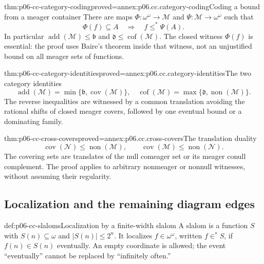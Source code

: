 \begin{hbtheorem}{thm:p06-cc-category-coding}{proved=annex:p06.cc.category-coding}{Coding a bound from a meager container}
There are maps \(\Phi:\omega^\omega\longrightarrow
\mathcal M\) and
\(\Psi:\mathcal M\longrightarrow\omega^\omega\) such that
\[
 \Phi(f)\subseteq A\quad\Longrightarrow\quad f\leq^*\Psi(A).
\]
In particular
\(\operatorname{add}(\mathcal M)\leq\mathfrak b\)
and \(\mathfrak d\leq\operatorname{cof}(\mathcal M)\).
The closed witness \(\Phi(f)\) is essential: the proof uses Baire's theorem
inside that witness, not an unjustified bound on all meager sets of functions.
\end{hbtheorem}

\begin{hbtheorem}{thm:p06-cc-category-identities}{proved=annex:p06.cc.category-identities}{The two category identities}
\[
\operatorname{add}(\mathcal M)
 =\min\{\mathfrak b,\operatorname{cov}(\mathcal M)\},
\quad
\operatorname{cof}(\mathcal M)
 =\max\{\mathfrak d,\operatorname{non}(\mathcal M)\}.
\]
The reverse inequalities are witnessed by a common translation avoiding
the rational shifts of closed meager covers, followed by one eventual
bound or a dominating family.
\end{hbtheorem}

\begin{hbtheorem}{thm:p06-cc-cross-covers}{proved=annex:p06.cc.cross-covers}{The translation duality}
\[
\operatorname{cov}(\mathcal N)
 \leq\operatorname{non}(\mathcal M),\qquad
\operatorname{cov}(\mathcal M)
 \leq\operatorname{non}(\mathcal N).
\]
The covering sets are translates of the null comeager set or its meager
conull complement. The proof applies to arbitrary nonmeager or nonnull
witnesses, without assuming their regularity.
\end{hbtheorem}

\subsection{Localization and the remaining diagram edges}

\begin{hbdefinition}{def:p06-cc-slaloms}{Localization by a finite-width slalom}
A slalom is a function \(S\) with \(S(n)\subseteq\omega\) and
\(|S(n)|\leq 2^n\). It localizes \(f\in\omega^\omega\), written
\(f\in^*S\), if \(f(n)\in S(n)\) eventually. An empty coordinate is
allowed; the event ``eventually'' cannot be replaced by ``infinitely often.''
\end{hbdefinition}

